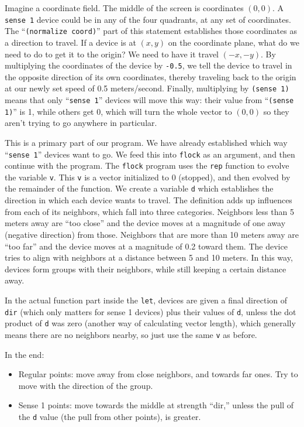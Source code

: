 \documentclass{article}
\newcommand\var[1]{{\tt #1}}
\newcommand\qvar[1]{``{\tt #1}''}
\begin{document}
Imagine a coordinate field.  The middle of the screen is coordinates
$(0, 0)$. A \var{sense 1} device could be in any of the four
quadrants, at any set of coordinates.  The \qvar{(normalize coord)}
part of this statement establishes those coordinates as a direction to
travel.  If a device is at $(x, y)$ on the coordinate plane, what do
we need to do to get it to the origin?  We need to have it travel
$(-x, -y)$.  By multiplying the coordinates of the device by
\var{-0.5}, we tell the device to travel in the opposite direction of
its own coordinates, thereby traveling back to the origin at our newly
set speed of 0.5 meters/second.  Finally, multiplying by \var{(sense
  1)} means that only \qvar{sense 1} devices will move this way: their
value from \qvar{(sense 1)} is 1, while others get 0, which will turn
the whole vector to $(0, 0)$ so they aren't trying to go anywhere in
particular.

This is a primary part of our program.  We have already established
which way \qvar{sense 1} devices want to go.  We feed this into
\var{flock} as an argument, and then continue with the program.  The
\var{flock} program uses the \var{rep} function to evolve the variable
\var{v}. This \var{v} is a vector initialized to 0 (stopped), and then
evolved by the remainder of the function.  We create a variable
\var{d} which establishes the direction in which each device wants to
travel.  The definition adds up influences from each of its neighbors,
which fall into three categories.  Neighbors less than 5 meters away
are ``too close'' and the device moves at a magnitude of one away
(negative direction) from those.  Neighbors that are more than 10
meters away are ``too far'' and the device moves at a magnitude of 0.2
toward them.  The device tries to align with neighbors at a distance
between 5 and 10 meters.  In this way, devices form groups with their
neighbors, while still keeping a certain distance away.

In the actual function part inside the \var{let}, devices are given a
final direction of \var{dir} (which only matters for sense 1 devices)
plus their values of \var{d}, unless the dot product of \var{d} was
zero (another way of calculating vector length), which generally means
there are no neighbors nearby, so just use the same \var{v} as before.

In the end:
\begin{itemize}
\item Regular points: move away from close neighbors, and towards far
  ones.  Try to move with the direction of the group.
\item Sense 1 points: move towards the middle at strength ``dir,''
  unless the pull of the \var{d} value (the pull from other points),
  is greater.
\end{itemize}
\end{document}
